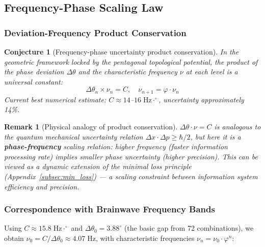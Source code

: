 \documentclass[12pt,a4paper,twocolumn]{article}
\renewcommand{\phi}{\varphi}
\newtheorem{remark}[theorem]{Remark}
\newtheorem{conjecture}[theorem]{Conjecture}
\begin{document}
\subsection{Frequency-Phase Scaling Law}
\label{subsec:freq_phase}

\subsubsection{Deviation-Frequency Product Conservation}

\begin{conjecture}[Frequency-phase uncertainty product conservation]
\label{conj:product_conservation_en}
In the geometric framework locked by the pentagonal topological potential, the product of the phase deviation $\Delta\theta$ and the characteristic frequency $\nu$ at each level is a universal constant:
\begin{equation}
\Delta\theta_n \times \nu_n = C, \quad \nu_{n+1} = \phi \cdot \nu_n
\label{eq:product_conservation_en}
\end{equation}
Current best numerical estimate: $C \approx 14$--$16\;\text{Hz}\cdot^\circ$, uncertainty approximately 14\%.
\end{conjecture}

\begin{remark}[Physical analogy of product conservation]
$\Delta\theta \cdot \nu = C$ is analogous to the quantum mechanical uncertainty relation $\Delta x \cdot \Delta p \geq \hbar/2$, but here it is a \textbf{phase-frequency} scaling relation: higher frequency (faster information processing rate) implies smaller phase uncertainty (higher precision). This can be viewed as a dynamic extension of the minimal loss principle (Appendix~\ref{subsec:min_loss}) --- a scaling constraint between information system efficiency and precision.
\end{remark}

\subsubsection{Correspondence with Brainwave Frequency Bands}

Using $C \approx 15.8\;\text{Hz}\cdot^\circ$ and $\Delta\theta_0 = 3.88^\circ$ (the basic gap from 72 combinations), we obtain $\nu_0 = C/\Delta\theta_0 \approx 4.07\;\text{Hz}$, with characteristic frequencies $\nu_n = \nu_0 \cdot \phi^n$:
\end{document}
